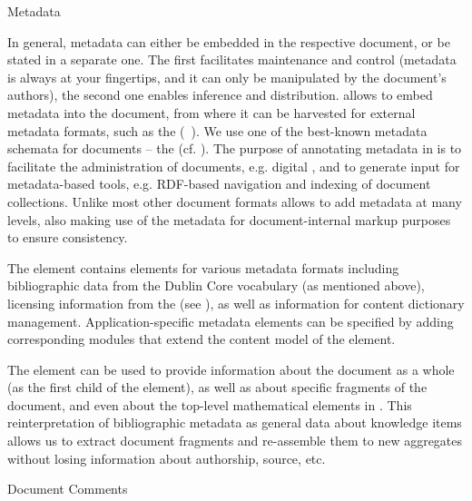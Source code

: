\begin{omgroup}[id=omdoc-infrastructure,short=Document Infrastructure]
\begin{omgroup}[id=docmetadata]{Metadata}
\begin{module}[id=metadata]
In general, metadata can either be embedded in the respective document, or be stated in a
separate one. The first facilitates maintenance and control (metadata is always at your
fingertips, and it can only be manipulated by the document's authors), the second one
enables inference and distribution. \omdoc allows to embed metadata into the document,
from where it can be harvested for external metadata formats, such as the {\xml}
{} ({\rdf}~\cite{LasSwi:rdf99}).  We use one of the
best-known metadata schemata for documents -- the {\emph{}} (cf.
{}). The purpose of annotating metadata in \omdoc is to
facilitate the administration of documents, e.g.  digital {},
and to generate input for metadata-based tools, e.g.  RDF-based navigation and indexing of
document collections. Unlike most other document formats \omdoc allows to add metadata
at many levels, also making use of the metadata for document-internal markup purposes to
ensure consistency.
  
\begin{definition}[id=metadata.def]
  The {} element contains elements for various metadata formats including
  bibliographic data from the Dublin Core vocabulary (as mentioned above), licensing
  information from the {} (see
  {}), as well as information for {\openmath} content dictionary
  management. Application-specific metadata elements can be specified by adding
  corresponding \omdoc modules that extend the content model of the 
  element.
\end{definition}

The \omdoc {} element can be used to provide information about the
document as a whole (as the first child of the  element), as well as
about specific fragments of the document, and even about the top-level mathematical
elements in \omdoc. This reinterpretation of bibliographic metadata as general data
about knowledge items allows us to extract document fragments and re-assemble them to new
aggregates without losing information about authorship, source, etc.
\end{module}
\end{omgroup}

\begin{omgroup}[id=comment]{Document Comments}
\begin{module}[id=comments]


\end{module}
\end{omgroup}
\end{omgroup}
